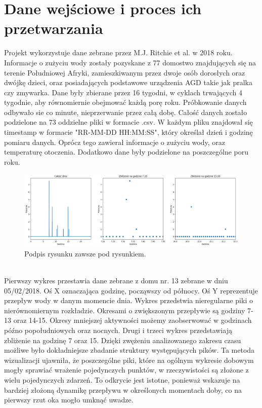 \documentclass[a4paper,twoside,12pt]{book}
\begin{document}
\newpage
\section{Dane wejściowe i proces ich przetwarzania}
Projekt wykorzystuje dane zebrane przez M.J. Ritchie et al.\cite{bib:artykul_dane} w 2018 roku. Informacje o zużyciu wody zostały pozyskane z 77 domostwo znajdujących się na terenie Południowej Afryki, zamieszkiwanym przez dwoje osób dorosłych oraz dwójkę dzieci, oraz posiadających podstawowe urządzenia AGD takie jak pralka czy zmywarka. Dane były zbierane przez 16 tygodni, w cyklach trwających 4 tygodnie, aby równomiernie obejmować każdą porę roku. Próbkowanie danych odbywało sie co minute, nieprzerwanie przez całą dobę. Całość danych zostało podzielone na 73 oddzielne pliki w formacie .csv. W każdym pliku znajdował się timestamp w formacie "RR-MM-DD HH:MM:SS", który określał dzień i godzinę pomiaru danych. Oprócz tego zawierał informacje o zużyciu wody, oraz temperaturę otoczenia. Dodatkowo dane były podzielone na poszczególne poru roku.\\
\begin{figure}[!h]
	\centering
	\includegraphics[width=1\textwidth]{img/Dane_nowe_disp.png}
	\caption{Podpis rysunku zawsze pod rysunkiem.}
	\label{fig:etykieta-rysunku}
\end{figure}\\
Pierwszy wykres przestawia dane zebrane z domu nr. 13 zebrane w dniu 05/02/2018. Oś X oznaczająca godzinę, począwszy od północy. Oś Y reprezentuje przepływ wody w danym momencie dnia. Wykres przedstwia nieregularne piki o nierównomiernym rozkładzie. Okresami o zwiększonym przepływie są godziny 7-13 oraz 14-15. Okresy mniejszej aktywności możemy zaobserwować w godzinach późno popołudniowych oraz nocnych. Drugi i trzeci wykres przedstawiają zbliżenie na godzinę 7 oraz 15. Dzięki zwężeniu analizowanego zakresu czasu możliwe było dokładniejsze zbadanie struktury występujących pików. Ta metoda wizualizacji ujawniła, że poszczególne piki, które na ogólnym wykresie dobowym mogły sprawiać wrażenie pojedynczych punktów, w rzeczywistości są złożone z wielu pojedynczych zdarzeń. To odkrycie jest istotne, ponieważ wskazuje na bardziej złożoną dynamikę przepływu w określonych momentach doby, co na pierwszy rzut oka mogło umknąć uwadze.\\
\end{document}
